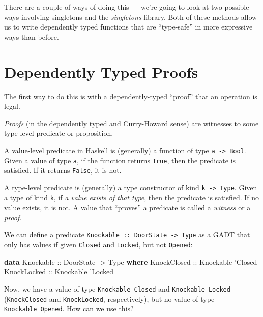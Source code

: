 \documentclass[]{article}
\newenvironment{Shaded}{}{}
\newcommand{\DataTypeTok}[1]{\textcolor[rgb]{0.56,0.13,0.00}{#1}}
\newcommand{\KeywordTok}[1]{\textcolor[rgb]{0.00,0.44,0.13}{\textbf{#1}}}
\newcommand{\NormalTok}[1]{#1}
\newcommand{\OtherTok}[1]{\textcolor[rgb]{0.00,0.44,0.13}{#1}}
\begin{document}
There are a couple of ways of doing this --- we're going to look at two possible
ways involving singletons and the \emph{singletons} library. Both of these
methods allow us to write dependently typed functions that are ``type-safe'' in
more expressive ways than before.

\hypertarget{dependently-typed-proofs}{%
\section{Dependently Typed Proofs}\label{dependently-typed-proofs}}

The first way to do this is with a dependently-typed ``proof'' that an operation
is legal.

\emph{Proofs} (in the dependently typed and Curry-Howard sense) are witnesses to
some type-level predicate or proposition.

A value-level predicate in Haskell is (generally) a function of type
\texttt{a\ -\textgreater{}\ Bool}. Given a value of type \texttt{a}, if the
function returns \texttt{True}, then the predicate is satisfied. If it returns
\texttt{False}, it is not.

A type-level predicate is (generally) a type constructor of kind
\texttt{k\ -\textgreater{}\ Type}. Given a type of kind \texttt{k}, if \emph{a
value exists of that type}, then the predicate is satisfied. If no value exists,
it is not. A value that ``proves'' a predicate is called a \emph{witness} or a
\emph{proof}.

We can define a predicate
\texttt{Knockable\ ::\ DoorState\ -\textgreater{}\ Type} as a GADT that only has
values if given \texttt{\textquotesingle{}Closed} and
\texttt{\textquotesingle{}Locked}, but not \texttt{\textquotesingle{}Opened}:

\begin{Shaded}
\begin{Highlighting}[]
\KeywordTok{data} \DataTypeTok{Knockable}\OtherTok{ ::} \DataTypeTok{DoorState} \OtherTok{->} \DataTypeTok{Type} \KeywordTok{where}
    \DataTypeTok{KnockClosed}\OtherTok{ ::} \DataTypeTok{Knockable}\NormalTok{ '}\DataTypeTok{Closed}
    \DataTypeTok{KnockLocked}\OtherTok{ ::} \DataTypeTok{Knockable}\NormalTok{ '}\DataTypeTok{Locked}
\end{Highlighting}
\end{Shaded}

Now, we have a value of type \texttt{Knockable\ \textquotesingle{}Closed} and
\texttt{Knockable\ \textquotesingle{}Locked} (\texttt{KnockClosed} and
\texttt{KnockLocked}, respectively), but no value of type
\texttt{Knockable\ \textquotesingle{}Opened}. How can we use this?
\end{document}
